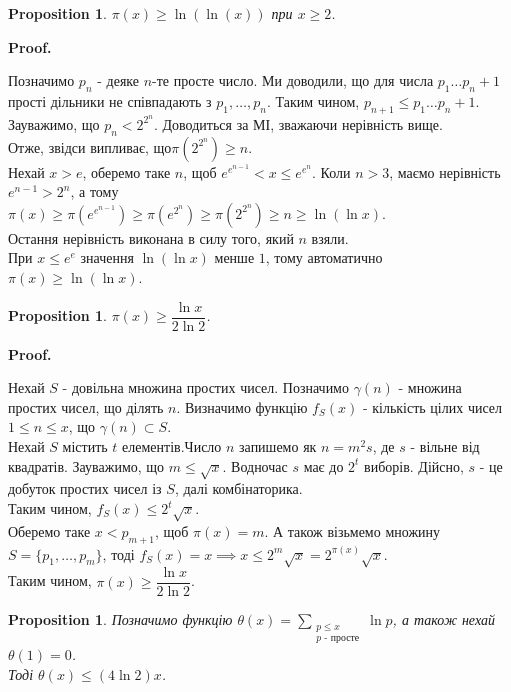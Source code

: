\documentclass[a4paper, 10pt]{article}
\makeatletter
\theoremstyle{theoremdd}
\theoremstyle{theoremdd}
\theoremstyle{theoremdd}
\theoremstyle{theoremdd}
\theoremstyle{theoremdd}
\newtheorem{proposition}[theorem]{Proposition}
\theoremstyle{theoremdd}
\theoremstyle{theoremdd}
\theoremstyle{theoremdd}
\renewenvironment{proof}[1][Proof.\\]{\par
\pushQED{\hfill \qed}%
\normalfont \topsep6\p@\@plus6\p@\relax
\trivlist
\item\relax
{\bfseries
#1\@addpunct{.}}\hspace\labelsep\ignorespaces
}{%
\popQED\endtrivlist\@endpefalse
}
\makeatother
\begin{document}
\begin{proposition}
$\pi(x) \geq \ln (\ln(x))$ при $x \geq 2$.
\end{proposition}

\begin{proof}
Позначимо $p_n$ - деяке $n$-те просте число. Ми доводили, що для числа $p_1 \dots p_n + 1$ прості дільники не співпадають з $p_1,\dots,p_n$. Таким чином, $p_{n+1} \leq p_1 \dots p_n + 1$.\\
Зауважимо, що $p_n < 2^{2^n}$. Доводиться за МІ, зважаючи нерівність вище.\\
Отже, звідси випливає, що$\pi\left(2^{2^n}\right) \geq n$.\\
Нехай $x > e$, оберемо таке $n$, щоб $e^{e^{n-1}} < x \leq e^{e^n}$. Коли $n > 3$, маємо нерівність $e^{n-1} > 2^n$, а тому\\
$\pi(x) \geq \pi\left(e^{e^{n-1}}\right) \geq \pi\left( e^{2^n}\right) \geq \pi\left( 2^{2^n}\right) \geq n \geq \ln (\ln x)$.\\
Остання нерівність виконана в силу того, який $n$ взяли.\\
При $x \leq e^e$ значення $\ln(\ln x)$ менше $1$, тому автоматично $\pi(x) \geq \ln (\ln x)$.
\end{proof}

\begin{proposition}
$\pi(x) \geq \dfrac{\ln x}{2 \ln 2}$.
\end{proposition}

\begin{proof}
Нехай $S$ - довільна множина простих чисел. Позначимо $\gamma(n)$ - множина простих чисел, що ділять $n$. Визначимо функцію $f_S(x)$ - кількість цілих чисел $1 \leq n \leq x$, що $\gamma(n) \subset S$.\\
Нехай $S$ містить $t$ елементів.Число $n$ запишемо як $n = m^2s$, де $s$ - вільне від квадратів. Зауважимо, що $m \leq \sqrt{x}$. Водночас $s$ має до $2^t$ виборів. Дійсно, $s$ - це добуток простих чисел із $S$, далі комбінаторика.\\
Таким чином, $f_S(x) \leq 2^t \sqrt{x}$.\\
Оберемо таке $x < p_{m+1}$, щоб $\pi(x) = m$. А також візьмемо множину $S = \{p_1,\dots,p_m\}$, тоді $f_S(x) = x \implies x \leq 2^m \sqrt{x} = 2^{\pi(x)} \sqrt{x}$.\\
Таким чином, $\pi(x) \geq \dfrac{\ln x}{2 \ln 2}$.
\end{proof}

\begin{proposition}
Позначимо функцію $\theta(x) = \displaystyle\sum_{\substack{p \leq x \\ p \text{ - просте}}} \ln p$, а також нехай $\theta(1) = 0$.\\
Тоді $\theta(x) \leq (4 \ln 2) x$.
\end{proposition}
\end{document}
